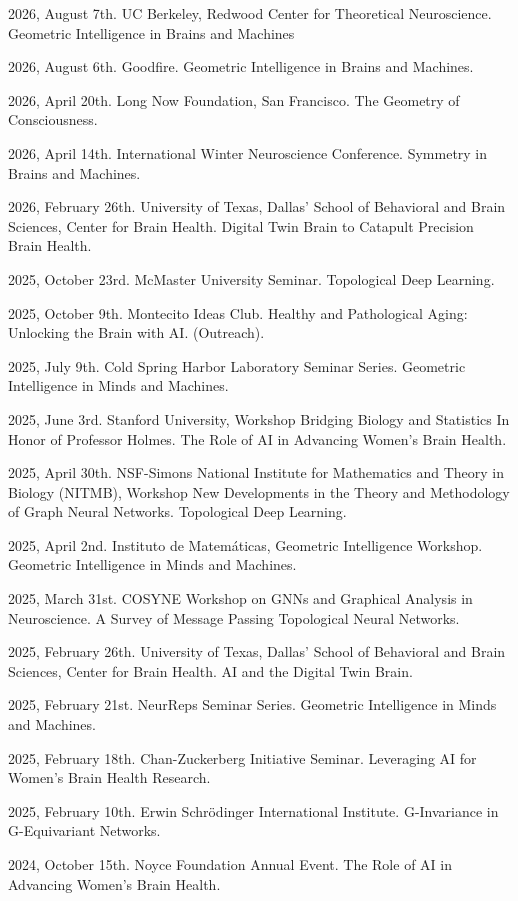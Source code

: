 2026, August 7th. UC Berkeley, Redwood Center for Theoretical Neuroscience. Geometric Intelligence in Brains and Machines

2026, August 6th. Goodfire. Geometric Intelligence in Brains and Machines.

2026, April 20th. Long Now Foundation, San Francisco. The Geometry of Consciousness.

2026, April 14th. International Winter Neuroscience Conference. Symmetry in Brains and Machines.

2026, February 26th. University of Texas, Dallas' School of Behavioral and Brain Sciences, Center for Brain Health. Digital Twin Brain to Catapult Precision Brain Health.

2025, October 23rd. McMaster University Seminar. Topological Deep Learning.

2025, October 9th. Montecito Ideas Club. Healthy and Pathological Aging: Unlocking the Brain with AI. (Outreach).

2025, July 9th. Cold Spring Harbor Laboratory Seminar Series. Geometric Intelligence in Minds and Machines.

2025, June 3rd. Stanford University, Workshop Bridging Biology and Statistics In Honor of Professor Holmes. The Role of AI in Advancing Women's Brain Health.

2025, April 30th. NSF-Simons National Institute for Mathematics and Theory in Biology (NITMB), Workshop New Developments in the Theory and Methodology of Graph Neural Networks. Topological Deep Learning.

2025, April 2nd. Instituto de Matemáticas, Geometric Intelligence Workshop. Geometric Intelligence in Minds and Machines.

2025, March 31st. COSYNE Workshop on GNNs and Graphical Analysis in Neuroscience. A Survey of Message Passing Topological Neural Networks.

2025, February 26th. University of Texas, Dallas' School of Behavioral and Brain Sciences, Center for Brain Health. AI and the Digital Twin Brain.

2025, February 21st. NeurReps Seminar Series. Geometric Intelligence in Minds and Machines.

2025, February 18th. Chan-Zuckerberg Initiative Seminar. Leveraging AI for Women’s Brain Health Research.

2025, February 10th. Erwin Schrödinger International Institute. G-Invariance in G-Equivariant Networks.

2024, October 15th. Noyce Foundation Annual Event. The Role of AI in Advancing Women’s Brain Health.

